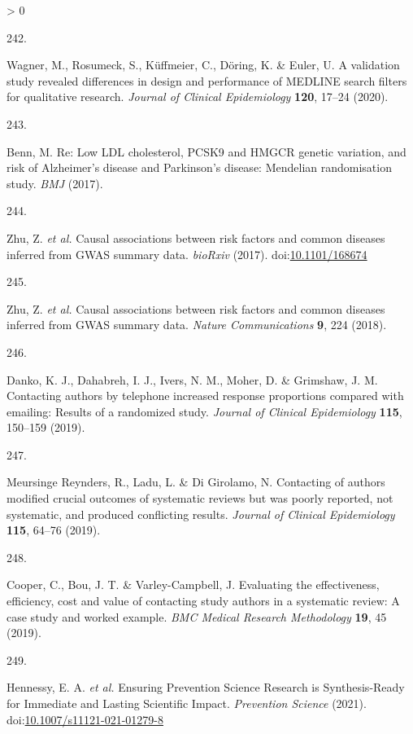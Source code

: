 \documentclass[a4paper, twoside]{templates/ociamthesis}
\newlength{\cslhangindent}
\newlength{\csllabelwidth}
\newenvironment{CSLReferences}[3] %
 {%
  \setlength{\parindent}{0pt}
  \ifodd #1 \everypar{\setlength{\hangindent}{\cslhangindent}}\ignorespaces\fi
  \ifnum #2 > 0
  \setlength{\parskip}{#2\baselineskip}
  \fi
 }%
 {}
\newcommand{\CSLLeftMargin}[1]{\parbox[t]{\maxof{\widthof{#1}}{\csllabelwidth}}{#1}}
\newcommand{\CSLRightInline}[1]{\parbox[t]{\linewidth - \csllabelwidth}{#1}}
\begin{document}
\begin{CSLReferences}{0}{0}
\leavevmode\hypertarget{ref-wagner2020}{}%
\CSLLeftMargin{242. }
\CSLRightInline{Wagner, M., Rosumeck, S., Küffmeier, C., Döring, K. \& Euler, U. A validation study revealed differences in design and performance of {MEDLINE} search filters for qualitative research. \emph{Journal of Clinical Epidemiology} \textbf{120}, 17--24 (2020).}

\leavevmode\hypertarget{ref-benn2017a}{}%
\CSLLeftMargin{243. }
\CSLRightInline{Benn, M. Re: {Low LDL} cholesterol, {PCSK9} and {HMGCR} genetic variation, and risk of {Alzheimer}'s disease and {Parkinson}'s disease: {Mendelian} randomisation study. \emph{BMJ} (2017).}

\leavevmode\hypertarget{ref-zhu2017}{}%
\CSLLeftMargin{244. }
\CSLRightInline{Zhu, Z. \emph{et al.} Causal associations between risk factors and common diseases inferred from {GWAS} summary data. \emph{bioRxiv} (2017). doi:\href{https://doi.org/10.1101/168674}{10.1101/168674}}

\leavevmode\hypertarget{ref-zhu2018}{}%
\CSLLeftMargin{245. }
\CSLRightInline{Zhu, Z. \emph{et al.} Causal associations between risk factors and common diseases inferred from {GWAS} summary data. \emph{Nature Communications} \textbf{9}, 224 (2018).}

\leavevmode\hypertarget{ref-danko2019}{}%
\CSLLeftMargin{246. }
\CSLRightInline{Danko, K. J., Dahabreh, I. J., Ivers, N. M., Moher, D. \& Grimshaw, J. M. Contacting authors by telephone increased response proportions compared with emailing: Results of a randomized study. \emph{Journal of Clinical Epidemiology} \textbf{115}, 150--159 (2019).}

\leavevmode\hypertarget{ref-meursingereynders2019}{}%
\CSLLeftMargin{247. }
\CSLRightInline{Meursinge Reynders, R., Ladu, L. \& Di Girolamo, N. Contacting of authors modified crucial outcomes of systematic reviews but was poorly reported, not systematic, and produced conflicting results. \emph{Journal of Clinical Epidemiology} \textbf{115}, 64--76 (2019).}

\leavevmode\hypertarget{ref-cooper2019}{}%
\CSLLeftMargin{248. }
\CSLRightInline{Cooper, C., Bou, J. T. \& Varley-Campbell, J. Evaluating the effectiveness, efficiency, cost and value of contacting study authors in a systematic review: A case study and worked example. \emph{BMC Medical Research Methodology} \textbf{19}, 45 (2019).}

\leavevmode\hypertarget{ref-hennessy2021}{}%
\CSLLeftMargin{249. }
\CSLRightInline{Hennessy, E. A. \emph{et al.} Ensuring {Prevention Science Research} is {Synthesis}-{Ready} for {Immediate} and {Lasting Scientific Impact}. \emph{Prevention Science} (2021). doi:\href{https://doi.org/10.1007/s11121-021-01279-8}{10.1007/s11121-021-01279-8}}


\end{CSLReferences}
\end{document}
